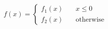 \[
f(x) = \left\{
  \begin{array}{ll}
    f_1(x) & \quad x \leq 0 \\
    f_2(x) & \quad \text{otherwise}
  \end{array}
  \right.
\]
